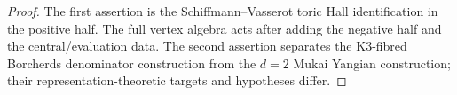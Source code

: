 \documentclass[11pt]{article}
\theoremstyle{plain}
\theoremstyle{definition}
\theoremstyle{remark}
\begin{document}
\begin{proof}
The first assertion is the Schiffmann--Vasserot toric Hall identification in
the positive half. The full vertex algebra acts after adding the negative
half and the central/evaluation data. The second assertion separates the
K3-fibred Borcherds denominator construction from the $d=2$ Mukai Yangian
construction; their representation-theoretic targets and hypotheses differ.
\end{proof}
\end{document}
